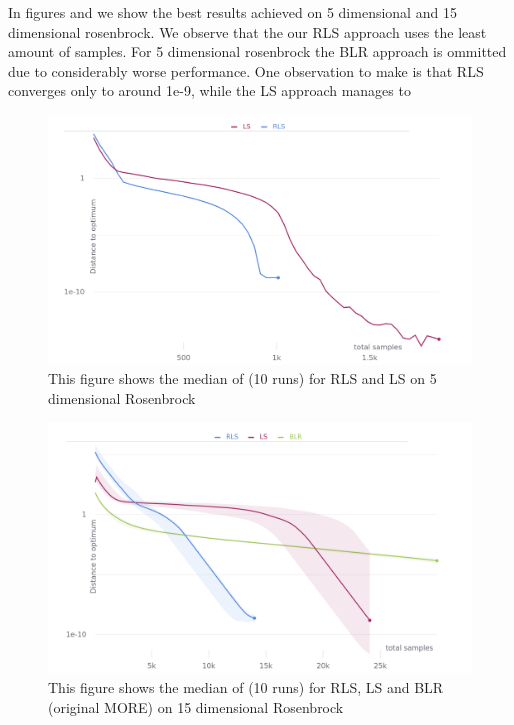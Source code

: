 In figures  and  we show the best results
achieved on 5 dimensional and 15 dimensional rosenbrock. We observe that
the our RLS approach uses the least amount of samples. For 5 dimensional
rosenbrock the BLR approach is ommitted due to considerably worse
performance.
One observation to make is that RLS converges only to around 1e-9, while
the LS approach manages to 
\begin{figure}[ht!]
     \centering
     \includegraphics[width=1\textwidth]{figures/5dim}
     \hspace{1cm}                       
     \caption{This figure shows the median of (10 runs) for RLS and LS on 5 dimensional Rosenbrock}
     \label{fig:5dim}
\end{figure}

\begin{figure}[ht!]
     \centering
     \includegraphics[width=1\textwidth]{figures/15dim}
     \hspace{1cm}                       
     \caption{This figure shows the median of (10 runs) for RLS, LS and BLR (original MORE) on 15 dimensional Rosenbrock}
     \label{fig:15dim}  
\end{figure}

